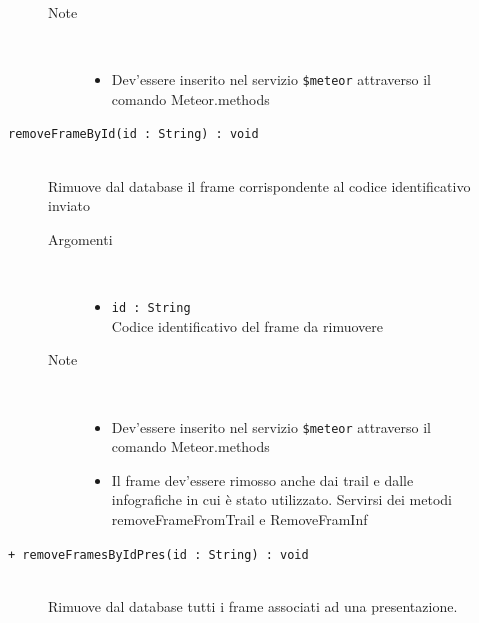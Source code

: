\begin{description}
\begin{description}
\begin{description}
\begin{itemize}
				\end{itemize}
			\item[Note] \hfill \\
			\begin{itemize}
					\item Dev'essere inserito nel servizio \texttt{\$meteor} attraverso il comando Meteor.methods
				\end{itemize}
		\end{description}
	\end{description}
	
	\begin{description}
		\item[\texttt{removeFrameById(id : String) : void			}] \hfill \\
			Rimuove dal database il frame corrispondente al codice identificativo inviato
			
		\begin{description}
			\item[Argomenti] \hfill \\
				\begin{itemize}
				
					\item \texttt{id : String			} \hfill \\
					Codice identificativo del frame da rimuovere
					
				\end{itemize}
			\item[Note] \hfill \\
			\begin{itemize}
					\item Dev'essere inserito nel servizio \texttt{\$meteor} attraverso il comando Meteor.methods
					\item Il frame dev'essere rimosso anche dai trail e dalle infografiche in cui è stato utilizzato. Servirsi dei metodi removeFrameFromTrail e RemoveFramInf
				\end{itemize}
		\end{description}
	\end{description}
	
	\begin{description}
		\item[\texttt{+ removeFramesByIdPres(id : String) : void			}] \hfill \\
			Rimuove dal database tutti i frame associati ad una presentazione.
			

\end{description}
\end{description}
